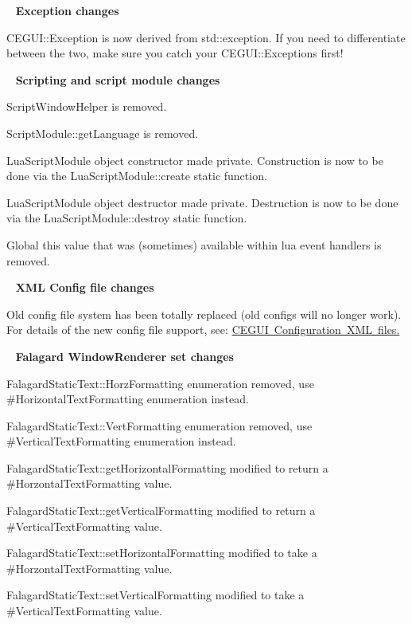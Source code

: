 ~\newline
 {\bfseries{Exception changes}}
\begin{DoxyItemize}
\item C\+E\+G\+U\+I\+::\+Exception is now derived from std\+::exception. If you need to differentiate between the two, make sure you catch your C\+E\+G\+U\+I\+::\+Exceptions first!
\end{DoxyItemize}

~\newline
 {\bfseries{Scripting and script module changes}}
\begin{DoxyItemize}
\item {\ttfamily Script\+Window\+Helper} is removed.
\item {\ttfamily Script\+Module\+::get\+Language} is removed.
\item Lua\+Script\+Module object constructor made private. Construction is now to be done via the Lua\+Script\+Module\+::create static function.
\item Lua\+Script\+Module object destructor made private. Destruction is now to be done via the Lua\+Script\+Module\+::destroy static function.
\item Global \textquotesingle{}this\textquotesingle{} value that was (sometimes) available within lua event handlers is removed.
\end{DoxyItemize}

~\newline
 {\bfseries{X\+ML Config file changes}}
\begin{DoxyItemize}
\item Old config file system has been totally replaced (old configs will no longer work). For details of the new config file support, see\+: \mbox{\hyperlink{xml_config}{C\+E\+G\+UI Configuration X\+ML files.}}
\end{DoxyItemize}

~\newline
 {\bfseries{Falagard Window\+Renderer set changes}}
\begin{DoxyItemize}
\item {\ttfamily Falagard\+Static\+Text\+::\+Horz\+Formatting} enumeration removed, use \#\+Horizontal\+Text\+Formatting enumeration instead.
\item {\ttfamily Falagard\+Static\+Text\+::\+Vert\+Formatting} enumeration removed, use \#\+Vertical\+Text\+Formatting enumeration instead.
\item Falagard\+Static\+Text\+::get\+Horizontal\+Formatting modified to return a \#\+Horzontal\+Text\+Formatting value.
\item Falagard\+Static\+Text\+::get\+Vertical\+Formatting modified to return a \#\+Vertical\+Text\+Formatting value.
\item Falagard\+Static\+Text\+::set\+Horizontal\+Formatting modified to take a \#\+Horzontal\+Text\+Formatting value.
\item Falagard\+Static\+Text\+::set\+Vertical\+Formatting modified to take a \#\+Vertical\+Text\+Formatting value.
\end{DoxyItemize}

